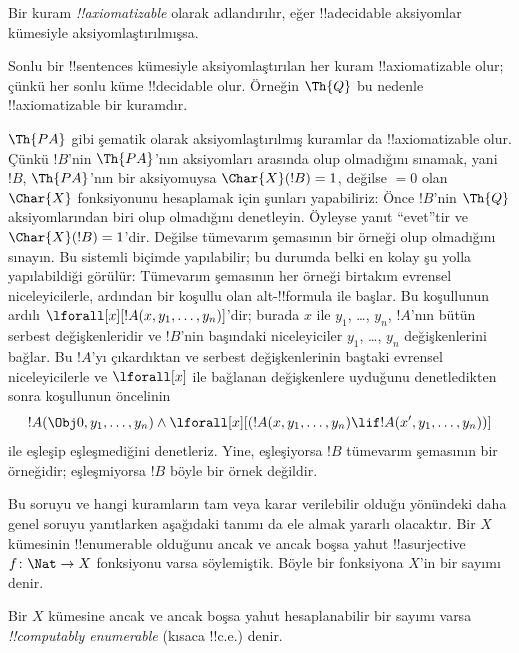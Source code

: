 \begin{defn}
Bir kuram \emph{!!{axiomatizable}} olarak adlandırılır, eğer
!!a{decidable} aksiyomlar kümesiyle aksiyomlaştırılmışsa.
\end{defn}

\begin{ex}
Sonlu bir !!{sentence}s kümesiyle aksiyomlaştırılan her kuram
!!{axiomatizable} olur; çünkü her sonlu küme !!{decidable} olur. Örneğin
$\Th{Q}$ bu nedenle !!{axiomatizable} bir kuramdır.

$\Th{PA}$ gibi şematik olarak aksiyomlaştırılmış kuramlar da
!!{axiomatizable} olur. Çünkü $!B$'nin $\Th{PA}$'nın aksiyomları arasında
olup olmadığını sınamak, yani $!B$, $\Th{PA}$'nın bir aksiyomuysa
$\Char{X}(!B)=1$, değilse $=0$ olan $\Char{X}$ fonksiyonunu hesaplamak için
şunları yapabiliriz: Önce $!B$'nin $\Th{Q}$ aksiyomlarından biri olup
olmadığını denetleyin. Öyleyse yanıt ``evet''tir ve
$\Char{X}(!B)=1$'dir. Değilse tümevarım şemasının bir örneği olup olmadığını
sınayın. Bu sistemli biçimde yapılabilir; bu durumda belki en kolay şu yolla
yapılabildiği görülür: Tümevarım şemasının her örneği birtakım evrensel
niceleyicilerle, ardından bir koşullu olan alt-!!{formula} ile başlar.
Bu koşullunun ardılı $\lforall[x][!A(x, y_1, \dots, y_n)]$'dir; burada
$x$ ile $y_1$, \dots, $y_n$, $!A$'nın bütün serbest değişkenleridir ve
$!B$'nin başındaki niceleyiciler $y_1$, \dots, $y_n$ değişkenlerini bağlar.
Bu $!A$'yı çıkardıktan ve serbest değişkenlerinin baştaki evrensel
niceleyicilerle ve $\lforall[x]$ ile bağlanan değişkenlere uyduğunu
denetledikten sonra koşullunun öncelinin
\[
!A(\Obj 0, y_1, \dots, y_n) \land \lforall[x][(!A(x, y_1, \dots, y_n)
\lif !A(x', y_1, \dots, y_n))]
\]
ile eşleşip eşleşmediğini denetleriz. Yine, eşleşiyorsa $!B$ tümevarım
şemasının bir örneğidir; eşleşmiyorsa $!B$ böyle bir örnek değildir.
\end{ex}

Bu soruyu ve hangi kuramların tam veya karar verilebilir olduğu yönündeki
daha genel soruyu yanıtlarken aşağıdaki tanımı da ele almak yararlı
olacaktır. Bir $X$ kümesinin !!{enumerable} olduğunu ancak ve ancak boşsa
yahut !!a{surjective} $f \colon \Nat \to X$ fonksiyonu varsa söylemiştik.
Böyle bir fonksiyona $X$'in bir sayımı denir.

\begin{defn}
Bir $X$ kümesine ancak ve ancak boşsa yahut hesaplanabilir bir sayımı varsa
\emph{!!{computably enumerable}} (kısaca !!{c.e.}) denir.
\end{defn}

